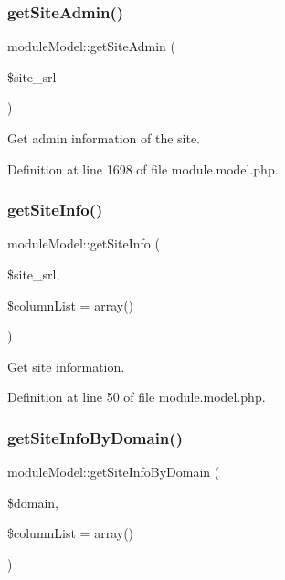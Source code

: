 \subsubsection{\texorpdfstring{get\+Site\+Admin()}{getSiteAdmin()}}
{\footnotesize\ttfamily module\+Model\+::get\+Site\+Admin (\begin{DoxyParamCaption}\item[{}]{\$site\+\_\+srl }\end{DoxyParamCaption})}



Get admin information of the site. 



Definition at line 1698 of file module.\+model.\+php.

\mbox{\label{classmoduleModel_a96446e3b8e031ec1264c7187cb1384a5}} 
\subsubsection{\texorpdfstring{get\+Site\+Info()}{getSiteInfo()}}
{\footnotesize\ttfamily module\+Model\+::get\+Site\+Info (\begin{DoxyParamCaption}\item[{}]{\$site\+\_\+srl,  }\item[{}]{\$column\+List = {\ttfamily array()} }\end{DoxyParamCaption})}



Get site information. 



Definition at line 50 of file module.\+model.\+php.

\mbox{\label{classmoduleModel_a6c4e1496c55c3c15507bb9532cb01c7f}} 
\subsubsection{\texorpdfstring{get\+Site\+Info\+By\+Domain()}{getSiteInfoByDomain()}}
{\footnotesize\ttfamily module\+Model\+::get\+Site\+Info\+By\+Domain (\begin{DoxyParamCaption}\item[{}]{\$domain,  }\item[{}]{\$column\+List = {\ttfamily array()} }\end{DoxyParamCaption})}




